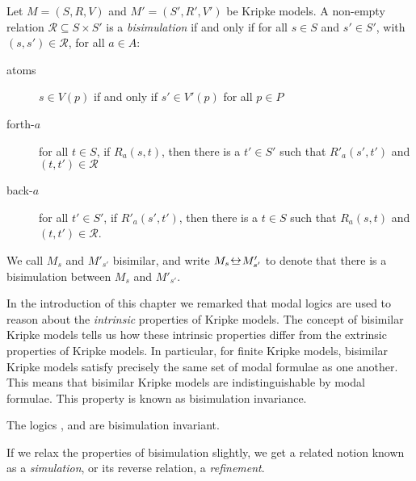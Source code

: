 \begin{definition}[Bisimulation]
Let $M = (S, R, V)$ and $M' = (S', R', V')$ be Kripke models. A non-empty
relation $\mathcal{R} \subseteq S \times S'$ is a \textit{bisimulation} if and
only if for all $s \in S$ and $s' \in S'$, with $(s, s') \in \mathcal{R}$, for
all $a \in A$:

\begin{description}
\item[atoms] $s \in V(p)$ if and only if $s' \in V'(p)$ for all
$p \in P$

\item[forth-$a$] for all $t \in S$, if $R_a(s, t)$, then there is a
$t' \in S'$ such that $R'_a(s', t')$ and $(t,
t') \in \mathcal{R}$

\item[back-$a$] for all $t' \in S'$, if $R'_a(s',
t')$, then there is a $t \in S$ such that $R_a(s, t)$ and $(t, t')
\in \mathcal{R}$.
\end{description}

We call $M_s$ and $M'_{s'}$ bisimilar, and write $M_s \bisim M'_{s'}$ to denote
that there is a bisimulation between $M_s$ and $M'_{s'}$.
\end{definition}

In the introduction of this chapter we remarked that modal logics are used to
reason about the {\em intrinsic} properties of Kripke models. The concept of
bisimilar Kripke models tells us how these intrinsic properties differ from the
extrinsic properties of Kripke models. In particular, for finite Kripke models,
bisimilar Kripke models satisfy precisely the same set of modal formulae as one
another. This means that bisimilar Kripke models are indistinguishable by modal
formulae. This property is known as bisimulation invariance.

\begin{lemma}
The logics \logicK{}, \logicKD{} and \logicS{} are bisimulation invariant.
\end{lemma}


If we relax the properties of bisimulation slightly, we get a related notion
known as a {\em simulation}, or its reverse relation, a {\em refinement}.

